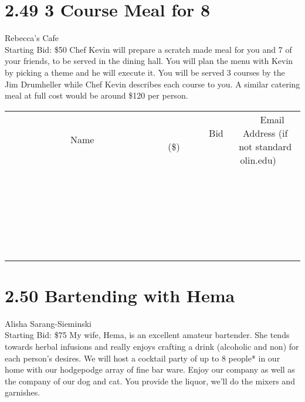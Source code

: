 \documentclass[11pt]{article}
\begin{document}
\section*{2.49 3 Course Meal for 8}
Rebecca's Cafe
\\
Starting Bid: \$50
\newline
Chef Kevin will prepare a scratch made meal for you and 7 of your friends, to be served in the dining hall. You will plan the menu with Kevin by picking a theme and he will execute it. You will be served 3 courses by the Jim Drumheller while Chef Kevin describes each course to you. A similar catering meal at full cost would be around \$120 per person.
\\[6ex]
\begin{tabular}{c c c}
~~~~~~~~~~~~~Name~~~~~~~~~~~~~ & ~~~~~~~~~Bid (\$)~~~~~~~~~  & ~~~Email Address (if not standard olin.edu)~~~\\
 & & \\
\hline
 & & \\
\hline
 & & \\
\hline
 & & \\
\hline
 & & \\
\hline
 & & \\
\hline
 & & \\
\hline
 & & \\
\hline
 & & \\
\hline
 & & \\
\hline
 & & \\
\hline
 & & \\
\hline
 & & \\
\hline
 & & \\
\hline
 & & \\
\hline
 & & \\
\hline
 & & \\
\hline
 & & \\
\hline
 & & \\
\hline
 & & \\
\hline
 & & \\
\hline
 & & \\
\hline
 & & \\
\hline
 & & \\
\hline
 & & \\
\hline
 & & \\
\hline
\end{tabular}
\newpage
\section*{2.50 Bartending with Hema}
Alisha Sarang-Sieminski
\\
Starting Bid: \$75
\newline
My wife, Hema, is an excellent amateur bartender. She tends towards herbal infusions and really enjoys crafting a drink (alcoholic and non) for each person's desires. We will host a cocktail party of up to 8 people* in our home with our hodgepodge array of fine bar ware.  Enjoy our company as well as the company of our dog and cat. You provide the liquor, we'll do the mixers and garnishes.
\end{document}
